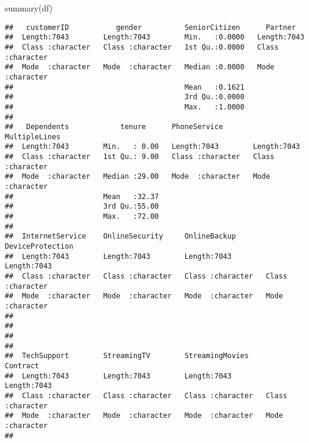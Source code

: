 \documentclass[
]{article}
\newenvironment{Shaded}{\begin{snugshade}}{\end{snugshade}}
\newcommand{\FunctionTok}[1]{\textcolor[rgb]{0.00,0.00,0.00}{#1}}
\newcommand{\NormalTok}[1]{#1}
\begin{document}
\begin{Shaded}
\begin{Highlighting}[]
\FunctionTok{summary}\NormalTok{(df)}
\end{Highlighting}
\end{Shaded}

\begin{verbatim}
##   customerID           gender          SeniorCitizen      Partner         
##  Length:7043        Length:7043        Min.   :0.0000   Length:7043       
##  Class :character   Class :character   1st Qu.:0.0000   Class :character  
##  Mode  :character   Mode  :character   Median :0.0000   Mode  :character  
##                                        Mean   :0.1621                     
##                                        3rd Qu.:0.0000                     
##                                        Max.   :1.0000                     
##                                                                           
##   Dependents            tenure      PhoneService       MultipleLines     
##  Length:7043        Min.   : 0.00   Length:7043        Length:7043       
##  Class :character   1st Qu.: 9.00   Class :character   Class :character  
##  Mode  :character   Median :29.00   Mode  :character   Mode  :character  
##                     Mean   :32.37                                        
##                     3rd Qu.:55.00                                        
##                     Max.   :72.00                                        
##                                                                          
##  InternetService    OnlineSecurity     OnlineBackup       DeviceProtection  
##  Length:7043        Length:7043        Length:7043        Length:7043       
##  Class :character   Class :character   Class :character   Class :character  
##  Mode  :character   Mode  :character   Mode  :character   Mode  :character  
##                                                                             
##                                                                             
##                                                                             
##                                                                             
##  TechSupport        StreamingTV        StreamingMovies      Contract        
##  Length:7043        Length:7043        Length:7043        Length:7043       
##  Class :character   Class :character   Class :character   Class :character  
##  Mode  :character   Mode  :character   Mode  :character   Mode  :character  
##                                                                             

\end{verbatim}
\end{document}

